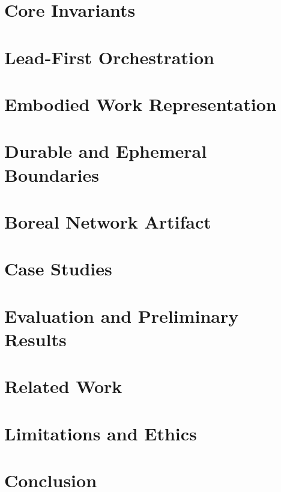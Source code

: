 \documentclass[10pt,conference]{IEEEtran}
\begin{document}
\section{Core Invariants}


\section{Lead-First Orchestration}


\section{Embodied Work Representation}


\section{Durable and Ephemeral Boundaries}


\section{Boreal Network Artifact}


\section{Case Studies}


\section{Evaluation and Preliminary Results}


\section{Related Work}


\section{Limitations and Ethics}


\section{Conclusion}




\end{document}
